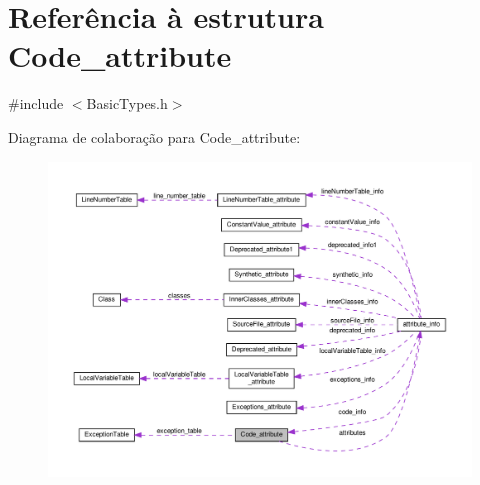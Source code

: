\hypertarget{structCode__attribute}{}\section{Referência à estrutura Code\+\_\+attribute}
\label{structCode__attribute}


{\ttfamily \#include $<$Basic\+Types.\+h$>$}



Diagrama de colaboração para Code\+\_\+attribute\+:\nopagebreak
\begin{figure}[H]
\begin{center}
\leavevmode
\includegraphics[width=350pt]{structCode__attribute__coll__graph}
\end{center}
\end{figure}

